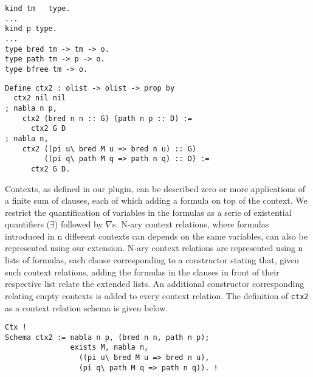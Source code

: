 \documentclass[nocopyrightspace,authoryear]{sigplanconf}
\begin{document}
\begin{lstlisting}
kind tm   type.
...
kind p type.
...
type bred tm -> tm -> o.
type path tm -> p -> o.
type bfree tm -> o.
\end{lstlisting}
\begin{lstlisting}
Define ctx2 : olist -> olist -> prop by
  ctx2 nil nil
; nabla n p,
    ctx2 (bred n n :: G) (path n p :: D) := 
      ctx2 G D
; nabla n,
    ctx2 ((pi u\ bred M u => bred n u) :: G)
         ((pi q\ path M q => path n q) :: D) :=
      ctx2 G D.
\end{lstlisting}

Contexts, as defined in our plugin, can be described zero or more applications of a finite sum of clauses, each of which adding a formula on top of the context. We restrict the quantification of variables in the formulas as a serie of existential quantifiers ($\exists$) followed by $\nabla$s. N-ary context relations, where formulas introduced in  n different contexts can depends on the same variables, can also be represented using our extension. N-ary context relations are represented using n lists of formulas, each clause corresponding to a constructor stating that, given such context relations, adding the formulas in the clauses in front of their respective list relate the extended lists. An additional constructor corresponding relating empty contexts is added to every context relation. The definition of \lstinline|ctx2| as a context relation schema is given below.

\begin{lstlisting}
Ctx !
Schema ctx2 := nabla n p, (bred n n, path n p);
               exists M, nabla n, 
                 ((pi u\ bred M u => bred n u), 
                 (pi q\ path M q => path n q)). !
\end{lstlisting}
\end{document}
